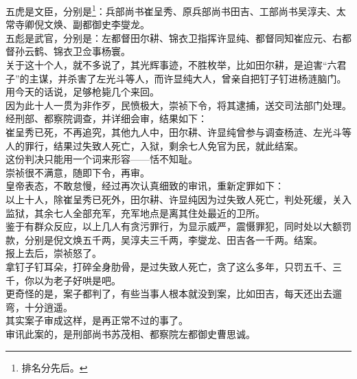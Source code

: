 \begin{multicols}{\theparacolNo}
五虎是文臣，分别是\footnote{排名分先后。}：兵部尚书崔呈秀、原兵部尚书田吉、工部尚书吴淳夫、太常寺卿倪文焕、副都御史李燮龙。\\

五彪是武官，分别是：左都督田尔耕、锦衣卫指挥许显纯、都督同知崔应元、右都督孙云鹤、锦衣卫佥事杨寰。\\

关于这十个人，就不多说了，其光辉事迹，不胜枚举，比如田尔耕，是迫害“六君子”的主谋，并杀害了左光斗等人，而许显纯大人，曾亲自把钉子钉进杨涟脑门。用今天的话说，足够枪毙几个来回。\\

因为此十人一贯为非作歹，民愤极大，崇祯下令，将其逮捕，送交司法部门处理。\\

经刑部、都察院调查，并详细会审，结果如下：\\

崔呈秀已死，不再追究，其他九人中，田尔耕、许显纯曾参与调查杨涟、左光斗等人的罪行，结果过失致人死亡，入狱，剩余七人免官为民，就此结案。\\

这份判决只能用一个词来形容——恬不知耻。\\

崇祯很不满意，随即下令，再审。\\

皇帝表态，不敢怠慢，经过再次认真细致的审讯，重新定罪如下：\\

以上十人，除崔呈秀已死外，田尔耕、许显纯因为过失致人死亡，判处死缓，关入监狱，其余七人全部充军，充军地点是离其住处最近的卫所。\\

鉴于有群众反应，以上几人有贪污罪行，为显示威严，震慑罪犯，同时处以大额罚款，分别是倪文焕五千两，吴淳夫三千两，李燮龙、田吉各一千两。结案。\\

报上去后，崇祯怒了。\\

拿钉子钉耳朵，打碎全身肋骨，是过失致人死亡，贪了这么多年，只罚五千、三千，你以为老子好哄是吧。\\

更奇怪的是，案子都判了，有些当事人根本就没到案，比如田吉，每天还出去遛弯，十分逍遥。\\

其实案子审成这样，是再正常不过的事了。\\

审讯此案的，是刑部尚书苏茂相、都察院左都御史曹思诚。\\


\end{multicols}
